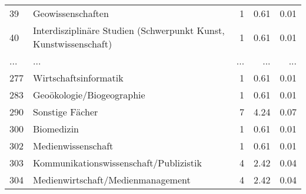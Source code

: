 \begin{longtable}{lXrrr}
        39 & \multicolumn{1}{X}{Geowissenschaften} & %
          \num{1} &
          \num[round-mode=places,round-precision=2]{0,61} &
          \num[round-mode=places,round-precision=2]{0,01} \\
        40 & \multicolumn{1}{X}{Interdisziplinäre Studien (Schwerpunkt Kunst, Kunstwissenschaft)} & %
          \num{1} &
          \num[round-mode=places,round-precision=2]{0,61} &
          \num[round-mode=places,round-precision=2]{0,01} \\
       ... & ... & ... & ... & ... \\
        277 & \multicolumn{1}{X}{Wirtschaftsinformatik} & %
          \num{1} &
          \num[round-mode=places,round-precision=2]{0,61} &
          \num[round-mode=places,round-precision=2]{0,01} \\

        283 & \multicolumn{1}{X}{Geoökologie/Biogeographie} & %
          \num{1} &
          \num[round-mode=places,round-precision=2]{0,61} &
          \num[round-mode=places,round-precision=2]{0,01} \\

        290 & \multicolumn{1}{X}{Sonstige Fächer} & %
          \num{7} &
          \num[round-mode=places,round-precision=2]{4,24} &
          \num[round-mode=places,round-precision=2]{0,07} \\

        300 & \multicolumn{1}{X}{Biomedizin} & %
          \num{1} &
          \num[round-mode=places,round-precision=2]{0,61} &
          \num[round-mode=places,round-precision=2]{0,01} \\

        302 & \multicolumn{1}{X}{Medienwissenschaft} & %
          \num{1} &
          \num[round-mode=places,round-precision=2]{0,61} &
          \num[round-mode=places,round-precision=2]{0,01} \\

        303 & \multicolumn{1}{X}{Kommunikationswissenschaft/Publizistik} & %
          \num{4} &
          \num[round-mode=places,round-precision=2]{2,42} &
          \num[round-mode=places,round-precision=2]{0,04} \\

        304 & \multicolumn{1}{X}{Medienwirtschaft/Medienmanagement} & %
          \num{4} &
          \num[round-mode=places,round-precision=2]{2,42} &
          \num[round-mode=places,round-precision=2]{0,04} \\


\end{longtable}
